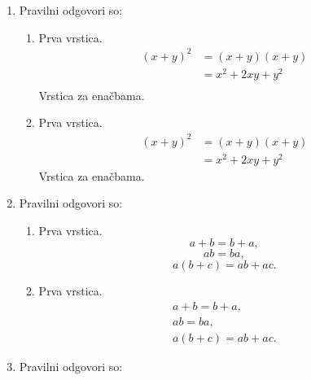 \documentclass[11pt]{article}
\begin{document}
\begin{enumerate}
    \item Pravilni odgovori so: %
    \begin{enumerate}
        \item Prva vrstica.
\begin{align*}
  (x + y)^2 &= (x + y)(x + y) \\
  &= x^2 + 2 x y + y^2 \\
\end{align*}
        Vrstica za enačbama.
        \item Prva vrstica.
\begin{align*}
  (x + y)^2 &= (x + y)(x + y) \\
  &= x^2 + 2 x y + y^2
\end{align*}
        Vrstica za enačbama.
    \end{enumerate}

    \item Pravilni odgovori so: %
    \begin{enumerate}
        \item Prva vrstica.
\[ a + b = b + a, \]
\[ a b = b a, \]
\[ a (b + c) = a b + a c. \]
        \item Prva vrstica.
\begin{gather*}
  a + b = b + a, \\
  a b = b a, \\
  a (b + c) = a b + a c.
\end{gather*}
    \end{enumerate}

    \item Pravilni odgovori so: %

\end{enumerate}
\end{document}
